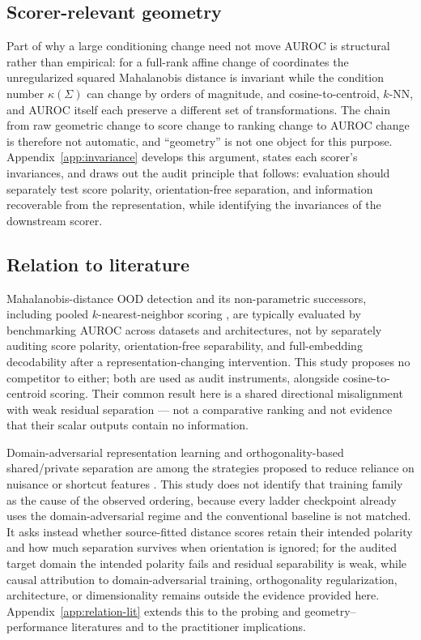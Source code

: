 \subsection{Scorer-relevant geometry}
\label{sec:invariance-pointer}

Part of why a large conditioning change need not move AUROC is structural rather than empirical: for a full-rank affine change of coordinates the unregularized squared Mahalanobis distance is invariant while the condition number $\kappa(\Sigma)$ can change by orders of magnitude, and cosine-to-centroid, $k$-NN, and AUROC itself each preserve a different set of transformations. The chain from raw geometric change to score change to ranking change to AUROC change is therefore not automatic, and ``geometry'' is not one object for this purpose. Appendix~\ref{app:invariance} develops this argument, states each scorer's invariances, and draws out the audit principle that follows: evaluation should separately test score polarity, orientation-free separation, and information recoverable from the representation, while identifying the invariances of the downstream scorer.

\subsection{Relation to literature}
\label{sec:relation-lit}

Mahalanobis-distance OOD detection \citep{lee2018simple} and its non-parametric successors, including pooled $k$-nearest-neighbor scoring \citep{sun2022knn}, are typically evaluated by benchmarking AUROC across datasets and architectures, not by separately auditing score polarity, orientation-free separability, and full-embedding decodability after a representation-changing intervention. This study proposes no competitor to either; both are used as audit instruments, alongside cosine-to-centroid scoring. Their common result here is a shared directional misalignment with weak residual separation --- not a comparative ranking and not evidence that their scalar outputs contain no information.

Domain-adversarial representation learning \citep{ganin2015unsupervised, ganin2016domain} and orthogonality-based shared/private separation \citep{bousmalis2016domain} are among the strategies proposed to reduce reliance on nuisance or shortcut features \citep{geirhos2020shortcut}. This study does not identify that training family as the cause of the observed ordering, because every ladder checkpoint already uses the domain-adversarial regime and the conventional baseline is not matched. It asks instead whether source-fitted distance scores retain their intended polarity and how much separation survives when orientation is ignored; for the audited target domain the intended polarity fails and residual separability is weak, while causal attribution to domain-adversarial training, orthogonality regularization, architecture, or dimensionality remains outside the evidence provided here. Appendix~\ref{app:relation-lit} extends this to the probing and geometry--performance literatures and to the practitioner implications.

